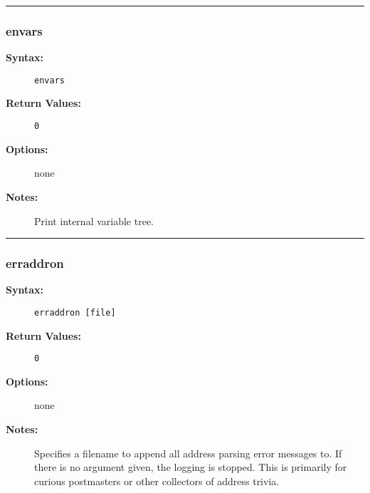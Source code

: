 \hrule
\subsubsection{envars}

\begin{description}
\item[{\bf Syntax:}] \mbox{}

{\tt envars}

\item[{\bf Return Values:}] \mbox{}

\begin{description}
\item[{\tt 0}] \mbox{}



\end{description}


\item[{\bf Options:}] \mbox{}

none  

\item[{\bf Notes:}] \mbox{}

Print internal variable tree.

\end{description}


\hrule
\subsubsection{erraddron}

\begin{description}
\item[{\bf Syntax:}] \mbox{}

{\tt erraddron [file]}

\item[{\bf Return Values:}] \mbox{}

\begin{description}
\item[{\tt 0}] \mbox{}



\end{description}


\item[{\bf Options:}] \mbox{}

none  

\item[{\bf Notes:}] \mbox{}

Specifies a filename to append all address 
parsing error messages to. If there is no argument given, the 
logging is stopped. This is primarily for curious postmasters 
or other collectors of address trivia.

\end{description}


